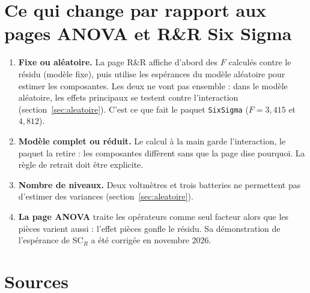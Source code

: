 \documentclass[11pt,a4paper]{article}
\theoremstyle{sj}
\theoremstyle{definition}
\theoremstyle{remark}
\newcommand{\SC}{\mathrm{SC}}
\begin{document}
\section[Ce qui change par rapport aux anciennes pages]{Ce qui change par rapport aux pages ANOVA et R\&R Six Sigma}

\begin{enumerate}[leftmargin=1.4em]
\item \textbf{Fixe ou aléatoire.} La page R\&R affiche d'abord des $F$ calculés contre le résidu (modèle fixe), puis utilise les espérances du modèle aléatoire pour estimer les composantes. Les deux ne vont pas ensemble : dans le modèle aléatoire, les effets principaux se testent contre l'interaction (section~\ref{sec:aleatoire}). C'est ce que fait le paquet \texttt{SixSigma} ($F=3{,}415$ et $4{,}812$).
\item \textbf{Modèle complet ou réduit.} Le calcul à la main garde l'interaction, le paquet la retire : les composantes diffèrent sans que la page dise pourquoi. La règle de retrait doit être explicite.
\item \textbf{Nombre de niveaux.} Deux voltmètres et trois batteries ne permettent pas d'estimer des variances (section~\ref{sec:aleatoire}).
\item \textbf{La page ANOVA} traite les opérateurs comme seul facteur alors que les pièces varient aussi : l'effet pièces gonfle le résidu. Sa démonstration de l'espérance de $\SC_R$ a été corrigée en novembre 2026.
\end{enumerate}

\section{Sources}
\end{document}
